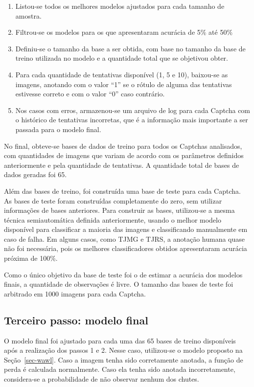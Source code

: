 \documentclass[12pt,twoside,brazilian]{book}
\providecommand{\tightlist}{%
  \setlength{\itemsep}{0pt}\setlength{\parskip}{0pt}}
\begin{document}
\begin{enumerate}
\def\labelenumi{\arabic{enumi}.}
\tightlist
\item
  Listou-se todos os melhores modelos ajustados para cada tamanho de
  amostra.
\item
  Filtrou-se os modelos para os que apresentaram acurácia de 5\% até
  50\%
\item
  Definiu-se o tamanho da base a ser obtida, com base no tamanho da base
  de treino utilizada no modelo e a quantidade total que se objetivou
  obter.
\item
  Para cada quantidade de tentativas disponível (1, 5 e 10), baixou-se
  as imagens, anotando com o valor ``1'' se o rótulo de alguma das
  tentativas estivesse correto e com o valor ``0'' caso contrário.
\item
  Nos casos com erros, armazenou-se um arquivo de log para cada Captcha
  com o histórico de tentativas incorretas, que é a informação mais
  importante a ser passada para o modelo final.
\end{enumerate}

No final, obteve-se bases de dados de treino para todos os Captchas
analisados, com quantidades de imagens que variam de acordo com os
parâmetros definidos anteriormente e pela quantidade de tentativas. A
quantidade total de bases de dados geradas foi 65.

Além das bases de treino, foi construída uma base de teste para cada
Captcha. As bases de teste foram construídas completamente do zero, sem
utilizar informações de bases anteriores. Para construir as bases,
utilizou-se a mesma técnica semiautomática definida anteriormente,
usando o melhor modelo disponível para classificar a maioria das imagens
e classificando manualmente em caso de falha. Em alguns casos, como TJMG
e TJRS, a anotação humana quase não foi necessária, pois os melhores
classificadores obtidos apresentaram acurácia próxima de 100\%.

Como o único objetivo da base de teste foi o de estimar a acurácia dos
modelos finais, a quantidade de observações é livre. O tamanho das bases
de teste foi arbitrado em 1000 imagens para cada Captcha.

\hypertarget{sec-modelo-final}{%
\subsection{Terceiro passo: modelo final}\label{sec-modelo-final}}

O modelo final foi ajustado para cada uma das 65 bases de treino
disponíveis após a realização dos passos 1 e 2. Nesse caso, utilizou-se
o modelo proposto na Seção~\ref{sec-wawl}. Caso a imagem tenha sido
corretamente anotada, a função de perda é calculada normalmente. Caso
ela tenha sido anotada incorretamente, considera-se a probabilidade de
não observar nenhum dos chutes.
\end{document}
